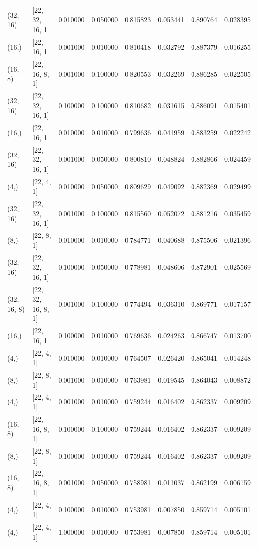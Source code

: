 \begin{tabular}{llrrrrrr}
(32, 16) & [22, 32, 16, 1] & 0.010000 & 0.050000 & 0.815823 & 0.053441 & 0.890764 & 0.028395 \\
(16,) & [22, 16, 1] & 0.001000 & 0.010000 & 0.810418 & 0.032792 & 0.887379 & 0.016255 \\
(16, 8) & [22, 16, 8, 1] & 0.001000 & 0.100000 & 0.820553 & 0.032269 & 0.886285 & 0.022505 \\
(32, 16) & [22, 32, 16, 1] & 0.100000 & 0.100000 & 0.810682 & 0.031615 & 0.886091 & 0.015401 \\
(16,) & [22, 16, 1] & 0.010000 & 0.010000 & 0.799636 & 0.041959 & 0.883259 & 0.022242 \\
(32, 16) & [22, 32, 16, 1] & 0.001000 & 0.050000 & 0.800810 & 0.048824 & 0.882866 & 0.024459 \\
(4,) & [22, 4, 1] & 0.010000 & 0.050000 & 0.809629 & 0.049092 & 0.882369 & 0.029499 \\
(32, 16) & [22, 32, 16, 1] & 0.001000 & 0.100000 & 0.815560 & 0.052072 & 0.881216 & 0.035459 \\
(8,) & [22, 8, 1] & 0.010000 & 0.010000 & 0.784771 & 0.040688 & 0.875506 & 0.021396 \\
(32, 16) & [22, 32, 16, 1] & 0.100000 & 0.050000 & 0.778981 & 0.048606 & 0.872901 & 0.025569 \\
(32, 16, 8) & [22, 32, 16, 8, 1] & 0.001000 & 0.100000 & 0.774494 & 0.036310 & 0.869771 & 0.017157 \\
(16,) & [22, 16, 1] & 0.100000 & 0.010000 & 0.769636 & 0.024263 & 0.866747 & 0.013700 \\
(4,) & [22, 4, 1] & 0.010000 & 0.010000 & 0.764507 & 0.026420 & 0.865041 & 0.014248 \\
(8,) & [22, 8, 1] & 0.001000 & 0.010000 & 0.763981 & 0.019545 & 0.864043 & 0.008872 \\
(4,) & [22, 4, 1] & 0.001000 & 0.010000 & 0.759244 & 0.016402 & 0.862337 & 0.009209 \\
(16, 8) & [22, 16, 8, 1] & 0.100000 & 0.100000 & 0.759244 & 0.016402 & 0.862337 & 0.009209 \\
(8,) & [22, 8, 1] & 0.100000 & 0.010000 & 0.759244 & 0.016402 & 0.862337 & 0.009209 \\
(16, 8) & [22, 16, 8, 1] & 0.001000 & 0.050000 & 0.758981 & 0.011037 & 0.862199 & 0.006159 \\
(4,) & [22, 4, 1] & 0.100000 & 0.010000 & 0.753981 & 0.007850 & 0.859714 & 0.005101 \\
(4,) & [22, 4, 1] & 1.000000 & 0.010000 & 0.753981 & 0.007850 & 0.859714 & 0.005101 \\

\end{tabular}
